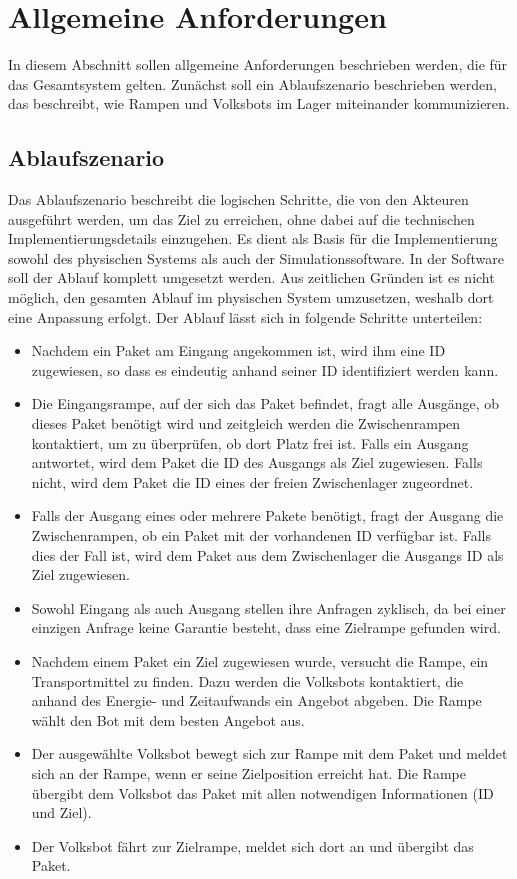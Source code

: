 \section{Allgemeine Anforderungen}
In diesem Abschnitt sollen allgemeine Anforderungen beschrieben werden, die für das Gesamtsystem gelten. Zunächst soll ein Ablaufszenario beschrieben werden, das beschreibt, wie Rampen und Volksbots im Lager miteinander kommunizieren.
\subsection{Ablaufszenario}\label{AL} 
Das Ablaufszenario beschreibt die logischen Schritte, die von den Akteuren ausgeführt werden, um das Ziel zu erreichen, ohne dabei auf die technischen Implementierungsdetails einzugehen. Es dient als Basis für die Implementierung sowohl des physischen Systems als auch der Simulationssoftware.
In der Software soll der Ablauf komplett umgesetzt werden. Aus zeitlichen Gründen ist es nicht möglich, den gesamten Ablauf im physischen System umzusetzen, weshalb dort eine Anpassung erfolgt. Der Ablauf lässt sich in folgende Schritte unterteilen:

\begin{itemize}
\item Nachdem ein Paket am Eingang angekommen ist, wird ihm eine ID zugewiesen, so dass es eindeutig anhand seiner ID identifiziert werden kann.
\item Die Eingangsrampe, auf der sich das Paket befindet, fragt alle Ausgänge, ob dieses Paket benötigt wird und zeitgleich werden die Zwischenrampen kontaktiert, um zu überprüfen, ob dort Platz frei ist. Falls ein Ausgang antwortet, wird dem Paket die ID des Ausgangs als Ziel zugewiesen. Falls nicht, wird dem Paket die ID eines der freien Zwischenlager zugeordnet.
\item
Falls der Ausgang eines oder mehrere Pakete benötigt, fragt der Ausgang die Zwischenrampen, ob ein Paket mit der vorhandenen ID verfügbar ist. Falls dies der Fall ist, wird dem Paket aus dem Zwischenlager die Ausgangs ID als Ziel zugewiesen.
\item
Sowohl Eingang als auch Ausgang stellen ihre Anfragen zyklisch, da bei einer einzigen Anfrage keine Garantie besteht, dass eine Zielrampe gefunden wird.
\item
Nachdem einem Paket ein Ziel zugewiesen wurde, versucht die Rampe, ein Transportmittel zu finden. Dazu werden die Volksbots kontaktiert, die anhand des Energie- und Zeitaufwands ein Angebot abgeben. Die Rampe wählt den Bot mit dem besten Angebot aus.
\item
Der ausgewählte Volksbot bewegt sich zur Rampe mit dem Paket und meldet sich an der Rampe, wenn er seine Zielposition erreicht hat. Die Rampe übergibt dem Volksbot das Paket mit allen notwendigen Informationen (ID und Ziel).
\item
Der Volksbot fährt zur Zielrampe, meldet sich dort an und übergibt das Paket.
\end{itemize} 
